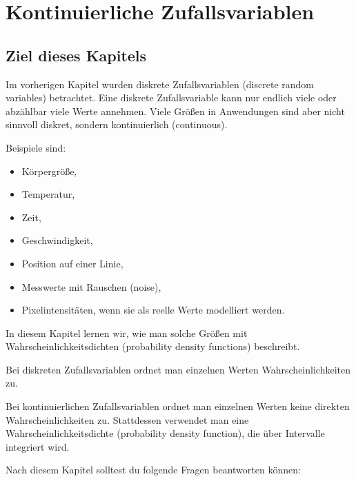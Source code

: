 \chapter{Kontinuierliche Zufallsvariablen}

\section{Ziel dieses Kapitels}

Im vorherigen Kapitel wurden diskrete Zufallsvariablen (discrete random variables) betrachtet.
Eine diskrete Zufallsvariable kann nur endlich viele oder abzählbar viele Werte annehmen.
Viele Größen in Anwendungen sind aber nicht sinnvoll diskret, sondern kontinuierlich (continuous).

Beispiele sind:

\begin{itemize}
    \item Körpergröße,
    \item Temperatur,
    \item Zeit,
    \item Geschwindigkeit,
    \item Position auf einer Linie,
    \item Messwerte mit Rauschen (noise),
    \item Pixelintensitäten, wenn sie als reelle Werte modelliert werden.
\end{itemize}

In diesem Kapitel lernen wir, wie man solche Größen mit Wahrscheinlichkeitsdichten (probability density functions) beschreibt.

\begin{conceptbox}
Bei diskreten Zufallsvariablen ordnet man einzelnen Werten Wahrscheinlichkeiten zu.

Bei kontinuierlichen Zufallsvariablen ordnet man einzelnen Werten keine direkten Wahrscheinlichkeiten zu.
Stattdessen verwendet man eine Wahrscheinlichkeitsdichte (probability density function), die über Intervalle integriert wird.
\end{conceptbox}

Nach diesem Kapitel solltest du folgende Fragen beantworten können:

